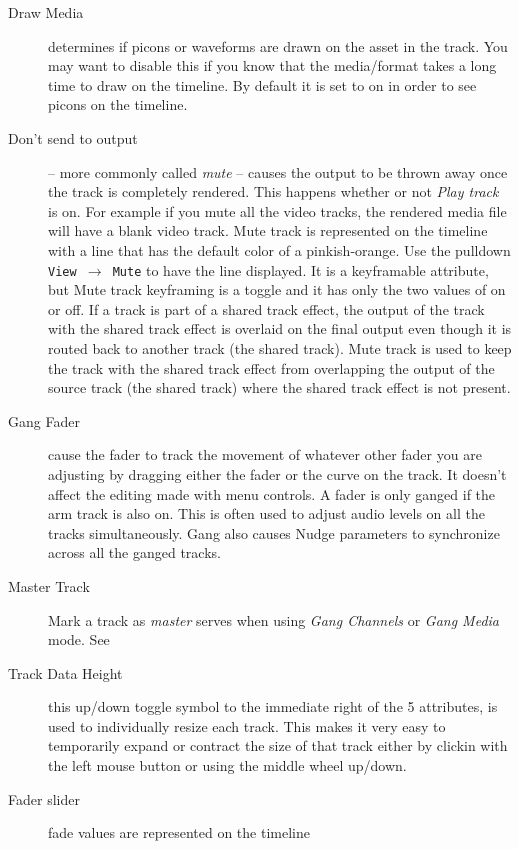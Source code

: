 \begin{description}
\item[Draw Media] determines if picons  or waveforms  are drawn on
  the asset in the track.  You may want to disable this if you know
  that the media/format takes a long time to draw on the timeline.  By
  default it is set to on in order to see picons on the timeline.
\item[Don’t send to output]  -- more commonly called
  \textit{mute} -- causes the output to be thrown away once the track is
  completely rendered. This happens whether or not \textit{Play track}
  is on.  For example if you mute all the video tracks, the rendered
  media file will have a blank video track.  Mute track is represented
  on the timeline with a line that has the default color of a
  pinkish-orange.  Use the pulldown \texttt{View $\rightarrow$ Mute} to
  have the line displayed.  It is a keyframable attribute, but Mute
  track keyframing is a toggle and it has only the two values of on or
  off. If a track is part of a shared track effect, the output of the
  track with the shared track effect is overlaid on the final output
  even though it is routed back to another track (the shared track).
  Mute track is used to keep the track with the shared track effect
  from overlapping the output of the source track (the shared track)
  where the shared track effect is not present.
\item[Gang Fader]  cause the fader to track the movement of
  whatever other fader you are adjusting by dragging either the fader
  or the curve on the track.  It doesn't affect the editing made with
  menu controls.  A fader is only ganged if the arm track is also on.
  This is often used to adjust audio levels on all the tracks
  simultaneously.  Gang also causes Nudge parameters to synchronize
  across all the ganged tracks.
\item[Master Track] Mark a track as \textit{master} serves when using \textit{Gang Channels} or \textit{Gang Media} mode. See 
\item[Track Data Height]  this up/down toggle symbol to the immediate right
of the 5 attributes, is used to individually resize each track.  This makes
it very easy to temporarily expand or contract the size of that track either
by clickin with the left mouse button or using the middle wheel up/down.
\item[Fader slider]  fade values are represented on the timeline

\end{description}
